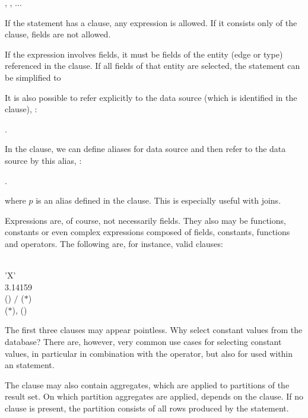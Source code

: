  , , $\dots$

If the statement has a  clause,
any expression is allowed.
If it consists only of the  clause,
fields are not allowed.

If the expression involves fields,
it must be fields of the entity (edge or type)
referenced in the  clause.
If all fields of that entity are selected,
the statement can be simplified to

 \keyword{$\ast$}

It is also possible to refer explicitly to the data source
(which is identified in the  clause), \eg:

 .

In the  clause, we can define aliases for data source
and then refer to the data source by this alias, \eg:

 .

where $p$ is an alias defined in the  clause.
This is especially useful with joins.

Expressions are, of course, not necessarily fields.
They also may be functions, constants or even complex expressions
composed of fields, constants, functions and operators.
The following are, for instance, valid  clauses:

\begin{minipage}{\textwidth}
  \\
 'X' \\
 3.14159 \\
 () $/$ ($\ast$)\\
 ($\ast$), ()
\end{minipage}

The first three clauses may appear pointless.
Why select constant values from the database?
There are, however, very common use cases
for selecting constant values, in particular
in combination with the  operator,
but also for  used within an
 statement.

The  clause may also contain aggregates,
which are applied to partitions of the result set.
On which partition
aggregates are applied, depends 
on the  clause. If no  clause
is present, the partition consists of all rows produced
by the  statement.

